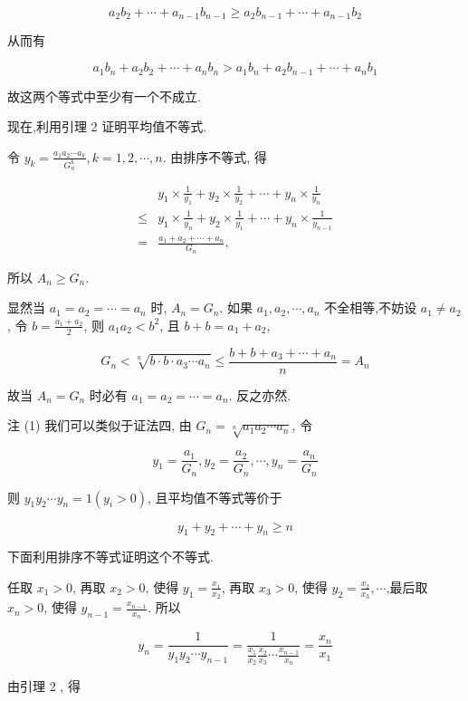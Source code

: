 $$
a_{2} b_{2}+\cdots+a_{n-1} b_{n-1} \geqslant a_{2} b_{n-1}+\cdots+a_{n-1} b_{2}
$$

从而有

$$
a_{1} b_{n}+a_{2} b_{2}+\cdots+a_{n} b_{n}>a_{1} b_{n}+a_{2} b_{n-1}+\cdots+a_{n} b_{1}
$$

故这两个等式中至少有一个不成立.

现在,利用引理 2 证明平均值不等式.

令 $y_{k}=\frac{a_{1} a_{2} \cdots a_{k}}{G_{n}^{k}}, k=1,2, \cdots, n$. 由排序不等式, 得

$$
\begin{aligned}
& y_{1} \times \frac{1}{y_{1}}+y_{2} \times \frac{1}{y_{2}}+\cdots+y_{n} \times \frac{1}{y_{n}} \\
\leqslant & y_{1} \times \frac{1}{y_{n}}+y_{2} \times \frac{1}{y_{1}}+\cdots+y_{n} \times \frac{1}{y_{n-1}} \\
= & \frac{a_{1}+a_{2}+\cdots+a_{n}}{G_{n}},
\end{aligned}
$$

所以 $A_{n} \geqslant G_{n}$.

显然当 $a_{1}=a_{2}=\cdots=a_{n}$ 时, $A_{n}=G_{n}$. 如果 $a_{1}, a_{2}, \cdots, a_{n}$ 不全相等,不妨设 $a_{1} \neq a_{2}$, 令 $b=\frac{a_{1}+a_{2}}{2}$, 则 $a_{1} a_{2}<b^{2}$, 且 $b+b=a_{1}+a_{2}$,

$$
G_{n}<\sqrt[n]{b \cdot b \cdot a_{3} \cdots a_{n}} \leqslant \frac{b+b+a_{3}+\cdots+a_{n}}{n}=A_{n}
$$

故当 $A_{n}=G_{n}$ 时必有 $a_{1}=a_{2}=\cdots=a_{n}$. 反之亦然.

注 (1) 我们可以类似于证法四, 由 $G_{n}=\sqrt[n]{a_{1} a_{2} \cdots a_{n}}$, 令

$$
y_{1}=\frac{a_{1}}{G_{n}}, y_{2}=\frac{a_{2}}{G_{n}}, \cdots, y_{n}=\frac{a_{n}}{G_{n}}
$$

则 $y_{1} y_{2} \cdots y_{n}=1\left(y_{i}>0\right)$, 且平均值不等式等价于

$$
y_{1}+y_{2}+\cdots+y_{n} \geqslant n
$$

下面利用排序不等式证明这个不等式.

任取 $x_{1}>0$, 再取 $x_{2}>0$, 使得 $y_{1}=\frac{x_{1}}{x_{2}}$, 再取 $x_{3}>0$, 使得 $y_{2}=\frac{x_{2}}{x_{3}}, \cdots$,最后取 $x_{n}>0$, 使得 $y_{n-1}=\frac{x_{n-1}}{x_{n}}$. 所以

$$
y_{n}=\frac{1}{y_{1} y_{2} \cdots y_{n-1}}=\frac{1}{\frac{x_{1}}{x_{2}} \frac{x_{2}}{x_{3}} \cdots \frac{x_{n-1}}{x_{n}}}=\frac{x_{n}}{x_{1}}
$$

由引理 2 , 得

